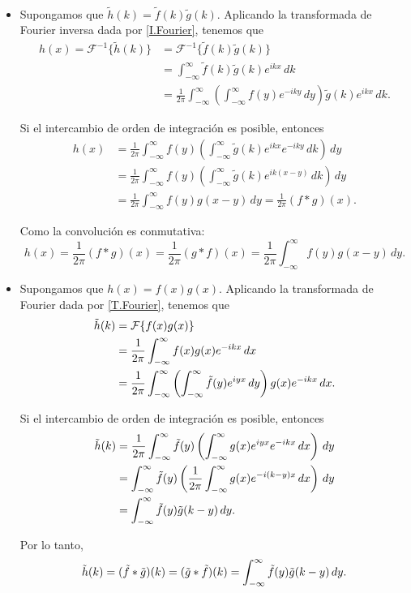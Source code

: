 \begin{demo}
\ 

\begin{itemize}
    \item Supongamos que  $\tilde{h}(k) = \tilde{f}(k) \tilde{g}(k)$. Aplicando la transformada de Fourier inversa dada por \eqref{I.Fourier}, tenemos que 
\begin{align*}
   h(x) = \mathcal{F}^{-1} \{\tilde{h}(k)\} &=  \mathcal{F}^{-1} \{\tilde{f}(k) \tilde{g}(k)\} \\
   &= \int_{-\infty}^{\infty} \tilde{f}(k) \tilde{g}(k) e^{ikx} \,dk \\
   &= \frac{1}{2\pi} \int_{-\infty}^{\infty}  \left( \int_{-\infty}^{\infty} f(y) e^{-ik y} \,dy \right) \tilde{g}(k)  e^{ikx}  \,dk.
\end{align*}

Si el intercambio de orden de integración es posible, entonces 
\begin{align*}
  h(x) &= \frac{1}{2\pi} \int_{-\infty}^{\infty}  f(y)  \left( \int_{-\infty}^{\infty}  \tilde{g}(k)  e^{ikx} e^{-ik y}\,d k \right) \,dy \\
   &= \frac{1}{2\pi} \int_{-\infty}^{\infty}  f(y)  \left( \int_{-\infty}^{\infty}  \tilde{g}(k)  e^{ik(x-y)}\,d k \right) \,dy \\
   &= \frac{1}{2\pi} \int_{-\infty}^{\infty}  f(y) g(x-y) \,dy = \frac{1}{2\pi} (f * g)(x).
\end{align*}

Como la convolución es conmutativa:
$$h(x) = \frac{1}{2\pi} (f * g)(x) = \frac{1}{2\pi} (g * f)(x)  = \frac{1}{2\pi} \int_{-\infty}^{\infty}  f(y) g(x-y) \,dy.$$

\item  Supongamos que $h(x) = f(x) g(x)$. Aplicando la transformada de Fourier dada por \eqref{T.Fourier}, tenemos que 
\begin{align*}
   \Tilde{h}(k) &=  \mathcal{F} \{f(x) g(x)\} \\
   &= \frac{1}{2\pi} \int_{-\infty}^{\infty} f(x) g(x) e^{-ikx} \,dx \\
   &=  \frac{1}{2\pi} \int_{-\infty}^{\infty} \left( \int_{-\infty}^{\infty} \Tilde{f}(y) e^{iyx} \,dy \right) g(x) e^{-ikx} \,dx.
\end{align*}

Si el intercambio de orden de integración es posible, entonces 
\begin{align*}
   \Tilde{h}(k) &=  \frac{1}{2\pi} \int_{-\infty}^{\infty} \Tilde{f}(y) \left( \int_{-\infty}^{\infty} g(x) e^{iyx}  e^{-ikx}\,dx \right) \,dy \\
   &=  \int_{-\infty}^{\infty} \Tilde{f}(y) \left( \frac{1}{2\pi} \int_{-\infty}^{\infty} g(x) e^{-i(k-y)x} \,dx \right) \,dy \\
   &=  \int_{-\infty}^{\infty} \Tilde{f}(y) \Tilde{g}(k-y) \,dy. 
\end{align*}

Por lo tanto,
$$\Tilde{h}(k) =  (\Tilde{f} * \Tilde{g})(k) = (\Tilde{g} * \Tilde{f})(k) = \int_{-\infty}^{\infty} \Tilde{f}(y) \Tilde{g}(k-y) \,dy.$$
\end{itemize}

\end{demo}


